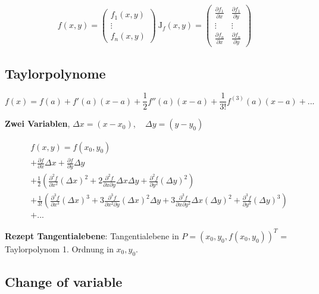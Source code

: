 \[
    f(x, y) =
        \begin{pmatrix}
            f_1(x, y)\\
            \vdots\\
            f_n(x, y)
        \end{pmatrix}\ 
    \text{J}_f(x, y) =
        \begin{pmatrix}
                \frac{\partial f_1}{\partial x} & \frac{\partial f_1}{\partial y}\\
                \vdots&\vdots\\
            \frac{\partial f_n}{\partial x} & \frac{\partial f_n}{\partial y}
        \end{pmatrix}
\]

\subsection{Taylorpolynome}

\[
    f(x) = f(a) + f'(a)(x-a) + \frac{1}{2} f''(a)(x-a) + \frac{1}{3!} f^{(3)}(a)(x-a) + ...
\]

\textbf{Zwei Variablen}, $\Delta x = (x - x_0)$, ~ $\Delta y = (y - y_0)$

\begin{tiny}
\begin{align*}
    \; & f(x, y) =f(x_0, y_0)\\ &+ \frac{\partial f}{\partial x} \Delta x + \frac{\partial f}{\partial y} \Delta y\\
    &+ \frac{1}{2} \left(\frac{\partial^2 f}{\partial x^2} (\Delta x)^2 + 2\frac{\partial^2 f}{\partial x \partial y} \Delta x \Delta y + \frac{\partial^2 f}{\partial y^2} (\Delta y)^2\right)\\
    &+ \frac{1}{3!} \left(\frac{\partial^3 f}{\partial x^3} (\Delta x)^3 + 3\frac{\partial^3 f}{\partial x^2 \partial y} (\Delta x)^2 \Delta y + 3\frac{\partial^3 f}{\partial x \partial y^2} \Delta x (\Delta y)^2 + \frac{\partial^3 f}{\partial y^3} (\Delta y)^3\right)\\
    & + ...
\end{align*}
\end{tiny}

\textbf{Rezept Tangentialebene}: Tangentialebene in $P=(x_0, y_0, f(x_0, y_0))^T$ = Taylorpolynom 1. Ordnung in $x_0, y_0$.

\subsection{Change of variable}

